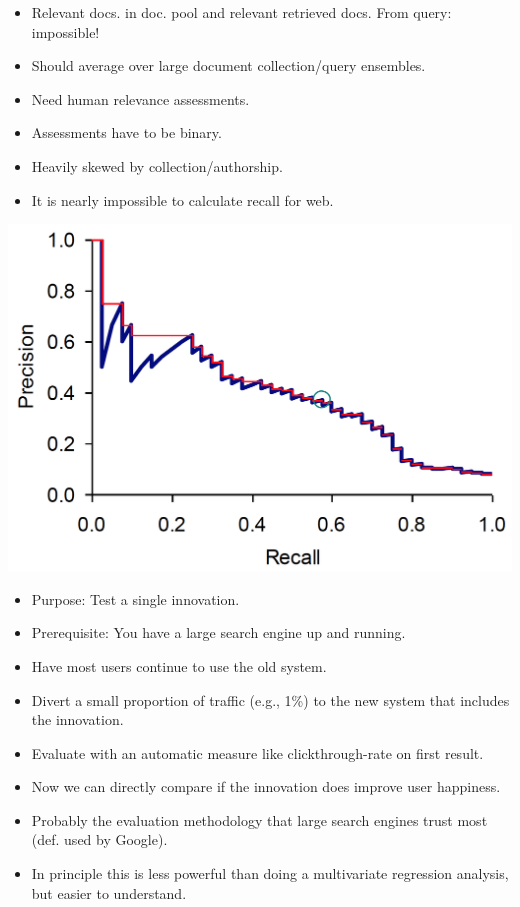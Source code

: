 \begin{breakbox}
\begin{itemize}
	\item Relevant docs. in doc. pool and relevant retrieved docs. From query: impossible!
	\item Should average over large document collection/query ensembles.
	\item Need human relevance assessments.
	\item Assessments have to be binary.
	\item Heavily skewed by collection/authorship.
	\item It is nearly impossible to calculate recall for web.
\end{itemize}
\end{breakbox}

\begin{breakbox}
\begin{center}
\includegraphics[width=.06\textwidth]{slides_images/precision_recall_curve}
\end{center}
\end{breakbox}

\begin{breakbox}
\begin{itemize}
	\item Purpose: Test a single innovation.
	\item Prerequisite: You have a large search engine up and running.
	\item Have most users continue to use the old system.
	\item Divert a small proportion of traffic (e.g., 1\%) to the new system that includes the innovation.
	\item Evaluate with an automatic measure like clickthrough-rate on first result.
	\item Now we can directly compare if the innovation does improve user happiness.
	\item Probably the evaluation methodology that large search engines trust most (def. used by Google).
	\item In principle this is less powerful than doing a multivariate regression analysis, but easier to understand.
\end{itemize}
\end{breakbox}

